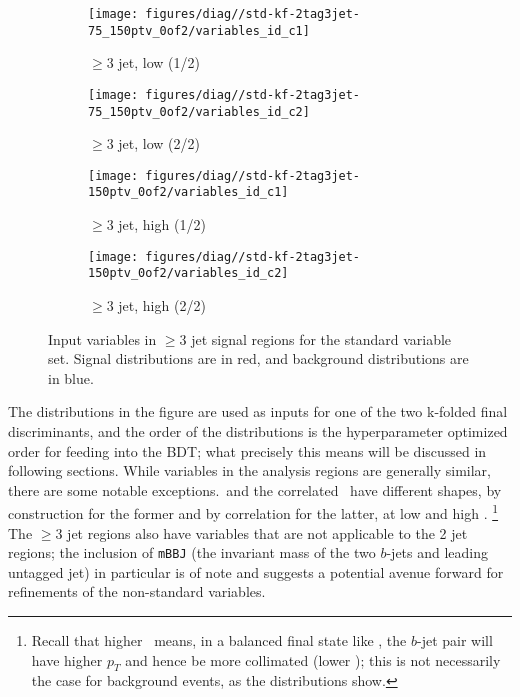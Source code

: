 \begin{figure}[!htbp]\captionsetup{justification=centering}
  \centering
\begin{subfigure}[t]{0.49\textwidth}\centering\texttt{[image: figures/diag//std-kf-2tag3jet-75\_150ptv\_0of2/variables\_id\_c1]}\caption{$\ge3$ jet, low \ptv (1/2)}\end{subfigure}
\begin{subfigure}[t]{0.49\textwidth}\centering\texttt{[image: figures/diag//std-kf-2tag3jet-75\_150ptv\_0of2/variables\_id\_c2]}\caption{$\ge3$ jet, low \ptv (2/2)}\end{subfigure}
\begin{subfigure}[t]{0.49\textwidth}\centering\texttt{[image: figures/diag//std-kf-2tag3jet-150ptv\_0of2/variables\_id\_c1]}\caption{$\ge3$ jet, high \ptv (1/2)}\end{subfigure}
\begin{subfigure}[t]{0.49\textwidth}\centering\texttt{[image: figures/diag//std-kf-2tag3jet-150ptv\_0of2/variables\_id\_c2]}\caption{$\ge3$ jet, high \ptv (2/2)}\end{subfigure}
  \caption{Input variables in $\ge3$ jet signal regions for the standard variable set.  Signal distributions are in red, and background distributions are in blue.}
  \label{fig:std-kf-inputs3}
\end{figure}
The distributions in the figure are used as inputs for one of the two k-folded final discriminants, and the order of the distributions is the hyperparameter optimized order for feeding into the BDT; what precisely this means will be discussed in following sections.  While variables in the analysis regions are generally similar, there are some notable exceptions.  \ptv\,and the correlated \drbb\, have different shapes, by construction for the former and by correlation for the latter, at low and high \ptv.  \footnote{Recall that higher \ptv\, means, in a balanced final state like \ZH, the $b$-jet pair will have higher $p_T$ and hence be more collimated (lower \drbb); this is not necessarily the case for background events, as the distributions show.}  The $\ge3$ jet regions also have variables that are not applicable to the 2 jet regions; the inclusion of \texttt{mBBJ} (the invariant mass of the two $b$-jets and leading untagged jet) in particular is of note and suggests a potential avenue forward for refinements of the non-standard variables.

